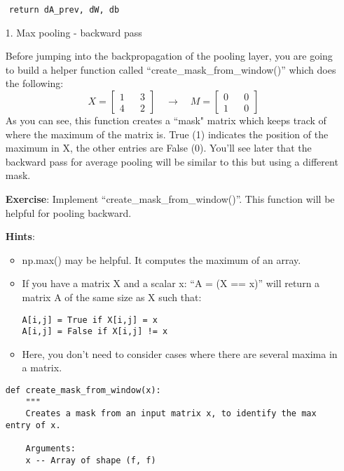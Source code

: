 {\begin{verbatim}
    return dA_prev, dW, db
\end{verbatim}




\begin{itemize}
\item[1.] Max pooling - backward pass  

Before jumping into the backpropagation of the pooling layer, you are going to build a helper function called ``create\_mask\_from\_window()'' which does the following: 
\begin{equation}
X = \begin{bmatrix}
1 && 3 \\
4 && 2
\end{bmatrix} \quad \rightarrow  \quad M =\begin{bmatrix}
0 && 0 \\
1 && 0
\end{bmatrix}
\end{equation}
As you can see, this function creates a ``mask" matrix which keeps track of where the maximum of the matrix is. True (1) indicates the position of the maximum in X, the other entries are False (0). You'll see later that the backward pass for average pooling will be similar to this but using a different mask.  

{\textbf{Exercise}}: Implement ``create\_mask\_from\_window()''. This function will be helpful for pooling backward. 

{\textbf{Hints}}:
\begin{itemize}
\item np.max() may be helpful. It computes the maximum of an array.
\item If you have a matrix X and a scalar x: ``A = (X == x)'' will return a matrix A of the same size as X such that:
\begin{verbatim}
A[i,j] = True if X[i,j] = x
A[i,j] = False if X[i,j] != x
\end{verbatim}
\item Here, you don't need to consider cases where there are several maxima in a matrix.
\end{itemize}

\begin{verbatim}
def create_mask_from_window(x):
    """
    Creates a mask from an input matrix x, to identify the max entry of x.
    
    Arguments:
    x -- Array of shape (f, f)
    

\end{verbatim}
\end{itemize}}
